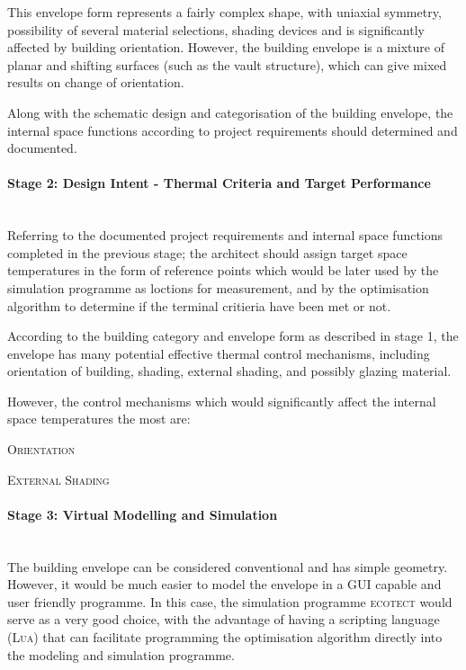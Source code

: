 This envelope form represents a fairly complex shape, with uniaxial symmetry, possibility of several material selections, shading devices and is significantly affected by building orientation. However, the building envelope is a mixture of planar and shifting surfaces (such as the vault structure), which can give mixed results on change of orientation.

Along with the schematic design and categorisation of the building envelope, the internal space functions according to project requirements should determined and documented.

\paragraph{Stage 2: Design Intent - Thermal Criteria and Target Performance}\mbox{}\\

Referring to the documented project requirements and internal space functions completed in the previous stage; the architect should assign target space temperatures in the form of reference points which would be later used by the simulation programme as loctions for measurement, and by the optimisation algorithm to determine if the terminal critieria have been met or not.

According to the building category and envelope form as described in stage 1, the envelope has many potential effective thermal control mechanisms, including orientation of building, shading, external shading, and possibly glazing material.

However, the control mechanisms which would significantly affect the internal space temperatures the most are:
\begin{compactenum}
	\item \textsc{Orientation}
	\item \textsc{External Shading}
\end{compactenum}

\paragraph{Stage 3: Virtual Modelling and Simulation}\mbox{}\\

The building envelope can be considered conventional and has simple geometry. However, it would be much easier to model the envelope in a GUI capable and user friendly programme. In this case, the simulation programme \textsc{ecotect} would serve as a very good choice, with the advantage of having a scripting language (\textsc{Lua}) that can facilitate programming the optimisation algorithm directly into the modeling and simulation programme.

